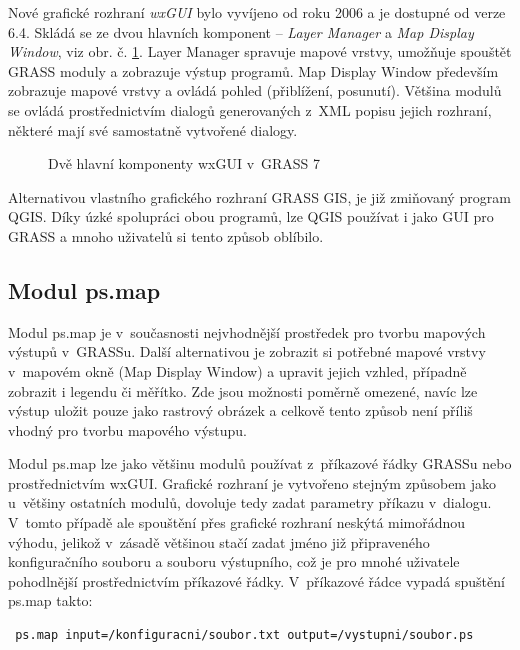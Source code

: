 \documentclass[a4paper,12pt,draft]{article}
\begin{document}
Nové grafické rozhraní \emph{wxGUI} bylo vyvíjeno od roku 2006 a je
dostupné od verze 6.4.  Skládá se ze dvou hlavních komponent -- \emph{Layer
Manager} a \emph{Map Display Window}, viz obr. č. \ref{fig:wxgui}. Layer
Manager spravuje mapové vrstvy, umožňuje spouštět GRASS moduly a zobrazuje
výstup programů. Map Display Window především zobrazuje mapové vrstvy
a ovládá pohled (přiblížení, posunutí). Většina modulů se ovládá
prostřednictvím dialogů generovaných z~XML popisu jejich rozhraní,
některé mají své samostatně vytvořené dialogy.
\begin{figure}[h!]
\centering
{}
\quad
{}
\caption{Dvě hlavní komponenty wxGUI v~GRASS 7\label{fig:wxgui}}

\end{figure}

Alternativou vlastního grafického rozhraní GRASS GIS, je již zmiňovaný
program QGIS. Díky úzké spolupráci obou programů, lze QGIS používat i jako GUI
pro GRASS a mnoho uživatelů si tento způsob oblíbilo.

\subsection{Modul ps.map}
\label{sec:psmap}
Modul ps.map je v~současnosti nejvhodnější prostředek pro tvorbu
mapových vý\-stupů v~GRASSu. Další alternativou je zobrazit si potřebné
mapové vrstvy v~mapovém okně (Map Display Window)  a upravit jejich vzhled,
případně zobrazit i legendu či měřítko. Zde jsou možnosti poměrně
omezené, navíc lze výstup uložit pouze jako rastrový obrázek a celkově
tento způsob není příliš vhodný pro tvorbu mapového výstupu.

Modul ps.map lze jako většinu modulů používat z~příkazové
řádky GRASSu nebo pro\-střed\-nic\-tvím wxGUI. Grafické rozhraní
je vytvořeno stejným způsobem jako u~většiny ostatních modulů,
dovoluje tedy zadat parametry příkazu v~dialogu. V~tomto případě ale
spouštění přes grafické rozhraní neskýtá mimořádnou výhodu,
jelikož v~zásadě většinou stačí zadat jméno již připraveného
konfiguračního souboru a souboru výstupního, což je pro mnohé uživatele
pohodlnější prostřednictvím příkazové řádky. V~příkazové řádce
vypadá spuštění ps.map takto:
\begin{verbatim}
 ps.map input=/konfiguracni/soubor.txt output=/vystupni/soubor.ps
\end{verbatim}
\end{document}
